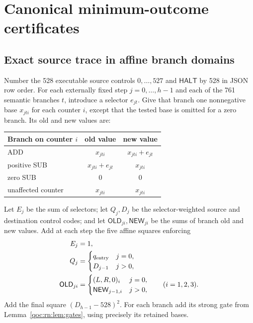 \documentclass[11pt,letterpaper]{article}
\theoremstyle{definition}
\theoremstyle{remark}
\newcommand{\HALT}{\mathsf{HALT}}
\newcommand{\OLD}{\mathsf{OLD}}
\newcommand{\NEW}{\mathsf{NEW}}
\begin{document}
\section{Canonical minimum-outcome certificates}
\label{qoc:rn:sec:canonical}
\subsection{Exact source trace in affine branch domains}
Number the 528 executable source controls $0,\ldots,527$ and $\HALT$ by 528 in JSON row order. For each externally fixed step $j=0,\ldots,h-1$ and each of the 761 semantic branches $t$, introduce a selector $e_{jt}$. Give that branch one nonnegative base $x_{jti}$ for each counter $i$, except that the tested base is omitted for a zero branch. Its old and new values are:
\begin{center}
\begin{tabular}{lcc}
\toprule
Branch on counter $i$ & old value & new value\\\midrule
ADD & $x_{jti}$ & $x_{jti}+e_{jt}$\\
positive SUB & $x_{jti}+e_{jt}$ & $x_{jti}$\\
zero SUB & $0$ & $0$\\
unaffected counter & $x_{jti}$ & $x_{jti}$\\\bottomrule
\end{tabular}
\end{center}
Let $E_j$ be the sum of selectors; let $Q_j,D_j$ be the selector-weighted source and destination control codes; and let $\OLD_{ji},\NEW_{ji}$ be the sums of branch old and new values. Add at each step the five affine squares enforcing
\begin{align*}
 E_j&=1,\\
 Q_j&=\begin{cases}q_{\rm entry}&j=0,\\D_{j-1}&j>0,\end{cases}\\
 \OLD_{ji}&=\begin{cases}(L,R,0)_i&j=0,\\\NEW_{j-1,i}&j>0,\end{cases}
 \qquad (i=1,2,3).
\end{align*}
Add the final square $(D_{h-1}-528)^2$. For each branch add its strong gate from Lemma~\ref{qoc:rn:lem:gates}, using precisely its retained bases.
\end{document}

